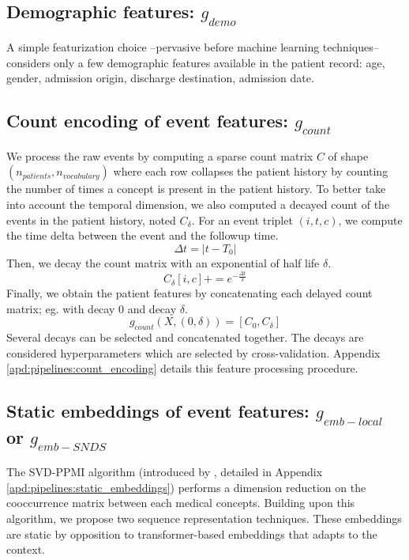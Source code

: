 \documentclass[french,12pt,twoside,a4paper]{book}
\begin{document}
\subsection{Demographic features: $g_{demo}$}\label{subsec:predictive_models:demographic}

A simple featurization choice --pervasive before machine learning techniques--
considers only a few demographic features available in the patient record: age,
gender, admission origin, discharge destination, admission date.

\subsection{Count encoding of event features: $g_{count}$}\label{subsec:predictive_models:count_encoding}

We process the raw events by computing a sparse count matrix $C$ of shape
$(n_{patients}, n_{vocabulary})$ where each row collapses the patient history by
counting the number of times a concept is present in the patient history. To
better take into account the temporal dimension, we also computed a decayed
count of the events in the patient history, noted $C_{\delta}$. For an event
triplet $(i, t, c)$, we compute the time delta between the event and the followup
time.
$$\Delta t = |t-T_0|$$
Then, we decay the count matrix with an exponential of half life $\delta$.
$$C_{\delta}[i, c] += e^{-\frac{\Delta t}{\delta}}$$%
Finally, we obtain the patient features by concatenating each
delayed count matrix; eg. with decay 0 and decay $\delta$.
$$g_{count}(X, (0, \delta))= [C_{0}, C_{\delta}]$$%
Several decays can be selected and concatenated together. The decays are
considered hyperparameters which are selected by cross-validation. Appendix
\ref{apd:pipelines:count_encoding} details this feature processing procedure.

\subsection{Static embeddings of event features: $g_{emb-local}$ or $g_{emb-SNDS}$}

The SVD-PPMI algorithm (introduced by \cite{beam2018big}, detailed in Appendix
\ref{apd:pipelines:static_embeddings}) performs a dimension reduction on the
cooccurrence matrix between each medical concepts. Building upon this algorithm,
we propose two sequence representation techniques. These embeddings are static
by opposition to transformer-based embeddings that adapts to the context.
\end{document}
